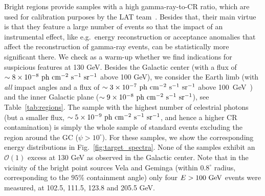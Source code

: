 \documentclass[aps,twocolumn,prd,superscriptaddress,showpacs,nofootinbib,fixfloat]{revtex4}
\newcommand{\s}{{\rm ~s}}
\newcommand{\cm}{{\rm ~cm}}
\newcommand{\ph}{{\rm ~ph}}
\newcommand{\sr}{{\rm ~sr}}
\newcommand{\GeV}{{\rm ~GeV}}
\begin{document}
Bright regions provide samples with a high gamma-ray-to-CR ratio,
which are used for calibration purposes by the LAT team~\cite{collaboration:2012kca}.
Besides that, their main virtue is that they feature a large number of events so
that the impact of an instrumental effect, like e.g.~energy
reconstruction or acceptance anomalies that affect the reconstruction of
gamma-ray events, can be statistically more
significant there. 
We check as a warm-up whether we find indications for
suspicious features at 130 GeV.
Besides the Galactic center (with a flux of $\sim 8\times10^{-8}
\ph\cm^{-2}\s^{-1}\sr^{-1}$ above 100 GeV), we consider the
Earth limb (with \emph{all} impact angles and a flux of $\sim3\times10^{-7}
\ph \cm^{-2}\s^{-1}\sr^{-1}$ above 100~GeV~\cite{FermiLimb}) and the inner
Galactic plane
($\sim9\times10^{-8}\ph\cm^{-2}\s^{-1}\sr^{-1}$), see
Table~\ref{tab:regions}. 
The sample with the highest number of celestrial photons 
(but a smaller flux, $\sim5\times10^{-9}\ph\cm^{-2}\s^{-1}\sr^{-1}$, and hence
a higher CR contamination) is
simply the whole sample of
standard events excluding the region around the GC
($\psi>10^\circ$).
For these samples, we show the corresponding energy
distributions in Fig.~\ref{fig:target_spectra}. None of the
samples exhibit an $\mathcal{O}(1)$ excess at 130 GeV as
observed in the Galactic center. Note that in the vicinity
of the bright point sources Vela and Geminga (within
$0.8^\circ$ radius, corresponding to the $95\%$ containment angle) 
only four $E>100\GeV$ events were measured, at
102.5, 111.5, 123.8 and 205.5 GeV.
\medskip
\end{document}
